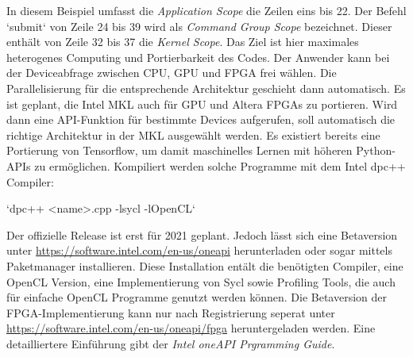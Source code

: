		In diesem Beispiel umfasst die \textit{Application Scope} die Zeilen eins bis 22. Der Befehl \li`submit` von Zeile 24 bis 39 wird als \textit{Command Group Scope} bezeichnet. Dieser enthält von Zeile 32 bis 37 die \textit{\Gls{Kernel} Scope}. Das Ziel ist hier maximales heterogenes Computing und Portierbarkeit des Codes. Der Anwender kann bei der Deviceabfrage zwischen CPU, GPU und FPGA frei wählen. Die Parallelisierung für die entsprechende Architektur geschieht dann automatisch. Es ist geplant, die Intel MKL auch für GPU und Altera FPGAs zu portieren. Wird dann eine API-Funktion für bestimmte Devices aufgerufen, soll automatisch die richtige Architektur in der MKL ausgewählt werden. Es existiert bereits eine Portierung von Tensorflow, um damit maschinelles Lernen mit höheren Python-\Glspl{API} zu ermöglichen. Kompiliert werden solche Programme mit dem Intel dpc++ Compiler:\\

		\begin{center} 
			\li`dpc++ <name>.cpp -lsycl -lOpenCL`
		\end{center}
		
		 Der offizielle Release ist erst für 2021 geplant. Jedoch lässt sich eine Betaversion unter \url{https://software.intel.com/en-us/oneapi} herunterladen oder sogar mittels Paketmanager installieren. Diese Installation entält die benötigten Compiler, eine OpenCL Version, eine Implementierung von Sycl sowie Profiling Tools, die auch für einfache OpenCL Programme genutzt werden können. Die Betaversion der FPGA-Implementierung kann nur nach Registrierung seperat unter \url{https://software.intel.com/en-us/oneapi/fpga} heruntergeladen werden. Eine detailliertere Einführung gibt der \textit{Intel oneAPI Prgramming Guide}. \autocite{oneapi}
		